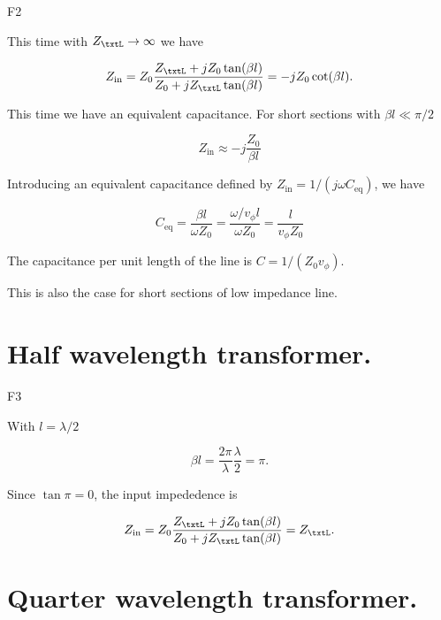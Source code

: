 F2

This time with \( Z_\txtL \rightarrow \infty \) we have

\begin{dmath}\label{eqn:uwavesDeck5SmithChartCore:120}
Z_{\textrm{in}} 
= Z_0 \frac{ Z_\txtL + j Z_0 \tan(\beta l) }{ Z_0 + j Z_\txtL \tan(\beta l)}
= -j Z_0 \cot(\beta l).
\end{dmath}

This time we have an equivalent capacitance.  For short sections with \( \beta l \ll \pi/2 \)

\begin{dmath}\label{eqn:uwavesDeck5SmithChartCore:140}
Z_{\textrm{in}}
\approx
-j \frac{Z_0}{\beta l}
\end{dmath}

Introducing an equivalent capacitance defined by \( Z_{\textrm{in}} = 1/(j \omega C_{\mathrm{eq}}) \), we have

\begin{dmath}\label{eqn:uwavesDeck5SmithChartCore:160}
C_{\mathrm{eq}}
=
\frac{ \beta l}{\omega Z_0}
=
\frac{ \omega/v_\phi l}{\omega Z_0}
=
\frac{ l}{v_\phi Z_0}
\end{dmath}

The capacitance per unit length of the line is \( C = 1/(Z_0 v_\phi) \).

This is also the case for short sections of low impedance line.

\section{Half wavelength transformer.}

F3

With \( l = \lambda/2 \)

\begin{dmath}\label{eqn:uwavesDeck5SmithChartCore:180}
\beta l 
= \frac{2 \pi}{\lambda} \frac{\lambda}{2}
= \pi.
\end{dmath}

Since \( \tan \pi = 0 \), the input impededence is

\begin{dmath}\label{eqn:uwavesDeck5SmithChartCore:200}
Z_{\textrm{in}} 
= Z_0 \frac{ Z_\txtL + j Z_0 \tan(\beta l) }{ Z_0 + j Z_\txtL \tan(\beta l)}
= Z_\txtL.
\end{dmath}

\section{Quarter wavelength transformer.}

